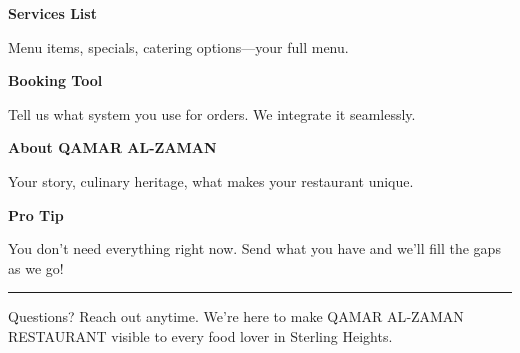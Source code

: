\documentclass[11pt,letterpaper]{article}
\begin{document}
\begin{minipage}[t]{0.48\textwidth}
\begin{tcolorbox}[colframe=accent-teal, boxrule=1pt, left=0.7em, right=0.7em, top=0.5em, bottom=0.5em, arc=4pt, boxsep=0pt]
{\bfseries\small\color{accent-teal}Services List}

\vspace{0.15em}

{\small Menu items, specials, catering options—your full menu.}
\end{tcolorbox}

\vspace{0.1em}

\begin{tcolorbox}[colframe=accent-teal, boxrule=1pt, left=0.7em, right=0.7em, top=0.5em, bottom=0.5em, arc=4pt, boxsep=0pt]
{\bfseries\small\color{accent-teal}Booking Tool}

\vspace{0.15em}

{\small Tell us what system you use for orders. We integrate it seamlessly.}
\end{tcolorbox}

\vspace{0.1em}

\begin{tcolorbox}[colframe=accent-teal, boxrule=1pt, left=0.7em, right=0.7em, top=0.5em, bottom=0.5em, arc=4pt, boxsep=0pt]
{\bfseries\small\color{accent-teal}About QAMAR AL-ZAMAN}

\vspace{0.15em}

{\small Your story, culinary heritage, what makes your restaurant unique.}
\end{tcolorbox}

\vspace{-0.2em}
\end{minipage}

\vspace{0.15em}

\begin{tcolorbox}[colback={accent-red!5}, colframe=accent-red!20, boxrule=0.5pt, left=0.7em, right=0.7em, top=0.4em, bottom=0.4em, arc=6pt, boxsep=0pt]

{\bfseries\small\color{accent-red}Pro Tip}

\vspace{0.1em}

{\small You don't need everything right now. Send what you have and we'll fill the gaps as we go!}

\end{tcolorbox}

\vspace{0.15em}

\noindent\hrule
\vspace{0.2em}

{\small\color{text-light}Questions? Reach out anytime. We're here to make QAMAR AL‑ZAMAN RESTAURANT visible to every food lover in Sterling Heights.}
\end{document}

